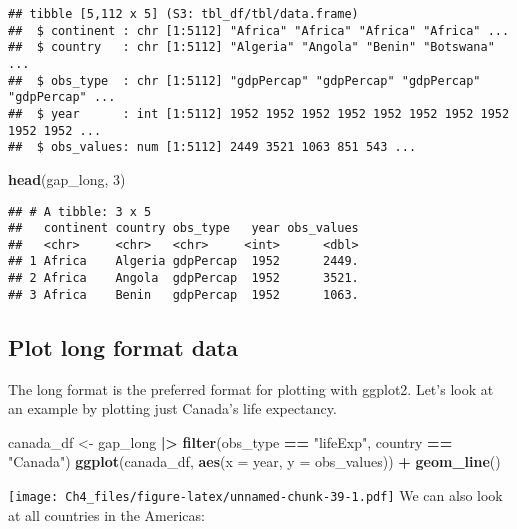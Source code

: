 \documentclass[
]{article}
\newenvironment{Shaded}{\begin{snugshade}}{\end{snugshade}}
\newcommand{\AttributeTok}[1]{\textcolor[rgb]{0.13,0.29,0.53}{#1}}
\newcommand{\DecValTok}[1]{\textcolor[rgb]{0.00,0.00,0.81}{#1}}
\newcommand{\FunctionTok}[1]{\textcolor[rgb]{0.13,0.29,0.53}{\textbf{#1}}}
\newcommand{\NormalTok}[1]{#1}
\newcommand{\OtherTok}[1]{\textcolor[rgb]{0.56,0.35,0.01}{#1}}
\newcommand{\SpecialCharTok}[1]{\textcolor[rgb]{0.81,0.36,0.00}{\textbf{#1}}}
\newcommand{\StringTok}[1]{\textcolor[rgb]{0.31,0.60,0.02}{#1}}
\begin{document}
\begin{verbatim}
## tibble [5,112 x 5] (S3: tbl_df/tbl/data.frame)
##  $ continent : chr [1:5112] "Africa" "Africa" "Africa" "Africa" ...
##  $ country   : chr [1:5112] "Algeria" "Angola" "Benin" "Botswana" ...
##  $ obs_type  : chr [1:5112] "gdpPercap" "gdpPercap" "gdpPercap" "gdpPercap" ...
##  $ year      : int [1:5112] 1952 1952 1952 1952 1952 1952 1952 1952 1952 1952 ...
##  $ obs_values: num [1:5112] 2449 3521 1063 851 543 ...
\end{verbatim}

\begin{Shaded}
\begin{Highlighting}[]
\FunctionTok{head}\NormalTok{(gap\_long, }\DecValTok{3}\NormalTok{)}
\end{Highlighting}
\end{Shaded}

\begin{verbatim}
## # A tibble: 3 x 5
##   continent country obs_type   year obs_values
##   <chr>     <chr>   <chr>     <int>      <dbl>
## 1 Africa    Algeria gdpPercap  1952      2449.
## 2 Africa    Angola  gdpPercap  1952      3521.
## 3 Africa    Benin   gdpPercap  1952      1063.
\end{verbatim}

\subsection{Plot long format data}\label{plot-long-format-data}

The long format is the preferred format for plotting with ggplot2. Let's
look at an example by plotting just Canada's life expectancy.

\begin{Shaded}
\begin{Highlighting}[]
\NormalTok{canada\_df }\OtherTok{\textless{}{-}}\NormalTok{ gap\_long }\SpecialCharTok{|\textgreater{}}
  \FunctionTok{filter}\NormalTok{(obs\_type }\SpecialCharTok{==} \StringTok{"lifeExp"}\NormalTok{,}
\NormalTok{         country }\SpecialCharTok{==} \StringTok{"Canada"}\NormalTok{)}
\FunctionTok{ggplot}\NormalTok{(canada\_df, }\FunctionTok{aes}\NormalTok{(}\AttributeTok{x =}\NormalTok{ year, }\AttributeTok{y =}\NormalTok{ obs\_values)) }\SpecialCharTok{+}
  \FunctionTok{geom\_line}\NormalTok{()}
\end{Highlighting}
\end{Shaded}

\texttt{[image: Ch4\_files/figure-latex/unnamed-chunk-39-1.pdf]} We can
also look at all countries in the Americas:
\end{document}
